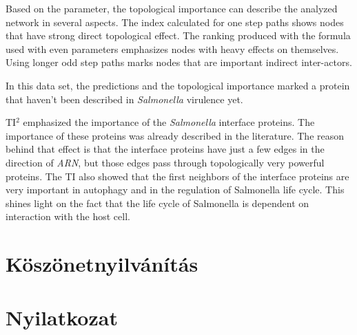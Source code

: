 \documentclass[a4paper,12pt]{article}
\begin{document}
		Based on the parameter, the topological importance can describe the analyzed network in several aspects. The index calculated for one step paths shows nodes that have strong direct topological effect. The ranking produced with the formula used with even parameters emphasizes nodes with heavy effects on themselves. Using longer odd step paths marks nodes that are important  indirect inter-actors.

		In this data set, the predictions and the topological importance marked a protein that haven't been described in \textit{Salmonella} virulence yet.

		TI$^2$ emphasized the importance of the \textit{Salmonella} interface proteins. The importance of these proteins was already described in the literature. The reason behind that effect is that the interface proteins have just a few edges in the direction of \textit{ARN}, but those edges pass through topologically very powerful proteins. The TI also showed that the first neighbors of the interface proteins are very important in autophagy and in the regulation of Salmonella life cycle. This shines light on the fact that the life cycle of Salmonella is dependent on interaction with the host cell.

		\pagebreak

\section{Köszönetnyilvánítás}

\section{Nyilatkozat}

\pagebreak


\printbibliography[title={Felhasznált irodalom}]
\end{document}
